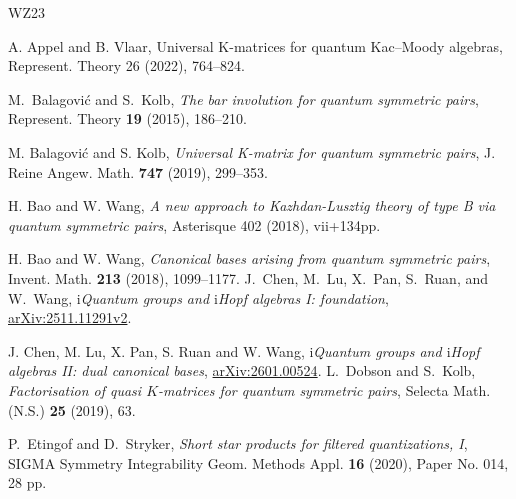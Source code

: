 \documentclass[a4paper,reqno,12pt]{amsart}
\numberwithin{equation}{section}
\newtheorem{theorem}[proposition]{Theorem}
\theoremstyle{definition}
\theoremstyle{plain}
\theoremstyle{definition}
\def\Z{\mathbb Z}
\def\I{\mathbb I}
\def\wI{\I_\circ}
\def\bw{w_\bullet}
\def\br{\mathbf r}
\def\tU{\widetilde{\mathbf U}}
\def \tbU{\tU_{\bullet}}
\def\tTD{\widetilde T}
\def\tTT{\widetilde{\mathbf T}}
\def\tk{\widetilde k}
\def\cR{\mathcal R}
\def\vs{\varsigma}
\def\dm{\diamond}
\newcommand{\tTa}[1]{\tTT'_{#1,-1}}
\begin{document}

\begin{thebibliography}{WZ23}

 A. Appel and B. Vlaar, Universal K-matrices for quantum Kac--Moody algebras, Represent. Theory 26 (2022), 764–824.

 M.~Balagovi{\'c} and S.~Kolb, \emph{The bar involution for quantum symmetric pairs}, Represent. Theory \textbf{19} (2015), 186--210.
  
		M. Balagovi\'c and S. Kolb, {\em Universal K-matrix for quantum symmetric pairs}, J. Reine
		Angew. Math. {\bf747} (2019), 299--353.
        
 H. Bao and W. Wang, {\em A new approach to Kazhdan-Lusztig theory of type B via quantum symmetric pairs}, Asterisque 402 (2018), vii+134pp. 

 H. Bao and W. Wang, {\em Canonical bases arising from quantum symmetric pairs}, Invent. Math. {\bf 213} (2018), 1099--1177.
 J.~Chen, M.~Lu, X.~Pan, S.~Ruan, and W.~Wang, \emph{$\mathrm i$Quantum groups and $\mathrm i$Hopf algebras I: foundation}, \href{https://arxiv.org/abs/2511.11291}{arXiv:2511.11291v2}.

 J. Chen, M. Lu, X. Pan, S. Ruan and W. Wang, 
{\em $\mathrm i$Quantum groups and $\mathrm i$Hopf algebras II: dual canonical bases}, \href{https://arxiv.org/abs/2601.00524}{arXiv:2601.00524}.
 L.~Dobson and S.~Kolb, \textit{Factorisation of quasi $K$-matrices for quantum symmetric pairs}, Selecta Math. (N.S.) {\bf 25} (2019), 63.

        
P.~Etingof and D.~Stryker, \emph{Short star products for filtered quantizations, {I}}, SIGMA Symmetry Integrability Geom. Methods Appl. \textbf{16} (2020), Paper No. 014, 28 pp.


\end{thebibliography}
\end{document}
